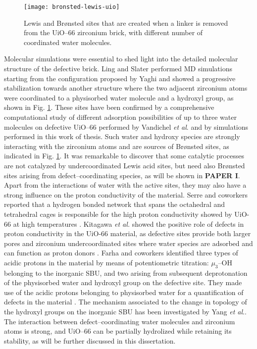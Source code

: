 \begin{figure}[!bhtp]
	\centering
 	\texttt{[image: bronsted-lewis-uio]}
	\caption{Lewis and Br\o{}nsted sites that are created when a linker is removed from the UiO--66 zirconium brick, with different number of coordinated water molecules.}
	\label{fig:bronsted-lewis-uio}
\end{figure}
\npar
Molecular simulations were essential to shed light into the detailed molecular structure of the defective brick. Ling and Slater \cite{ling2016dynamic} performed MD simulations starting from the configuration proposed by Yaghi and showed a progressive stabilization towards another structure where the two adjacent zirconium atoms were coordinated to a physisorbed water molecule and a hydroxyl group, as shown in Fig. \ref{fig:bronsted-lewis-uio}. These sites have been confirmed by a comprehensive computational study of different adsorption possibilities of up to three water molecules on defective UiO--66 performed by Vandichel \textit{et al}. \cite{vandichel2016water} and by simulations performed in this work of thesis.
Such water and hydroxy species are strongly interacting with the zirconium atoms and are sources of Br\o{}nsted sites, as indicated in Fig. \ref{fig:bronsted-lewis-uio}. It was remarkable to discover that some catalytic processes are not catalyzed by undercoordinated Lewis acid sites, but need also Br\o{}nsted sites arising from defect--coordinating species, as will be shown in \textbf{PAPER I}. Apart from the interactions of water with the active sites, they may also have a strong influence on the proton conductivity of the material. Serre and coworkers reported that a hydrogen bonded network that spans the octahedral and tetrahedral cages is responsible for the high proton conductivity showed by UiO-66 at high temperatures \cite{borges2016proton}. Kitagawa \textit{et al.} showed the positive role of defects in proton conductivity in the UiO-66 material, as defective sites provide both larger pores and zirconium undercoordinated sites where water species are adsorbed and can function as proton donors \cite{taylor2015defect}. Farha and coworkers identified three types of acidic protons in the material by means of potentiometric titration: $\mu_{3}$--OH belonging to the inorganic SBU, and two arising from subsequent deprotonation of the physisorbed water and hydroxyl group on the defective site. They made use of the acidic protons belonging to physisorbed water for a quantification of defects in the material \cite{klet2016evaluation}. The mechanism associated to the change in topology of the hydroxyl groups on the inorganic SBU has been investigated by Yang \textit{et al}.\cite{yang2016tuning}. The interaction between defect--coordinating water molecules and zirconium atoms is strong, and UiO--66 can be partially hydrolized\cite{decoste2013stability} while retaining its stability, as will be further discussed in this dissertation.
